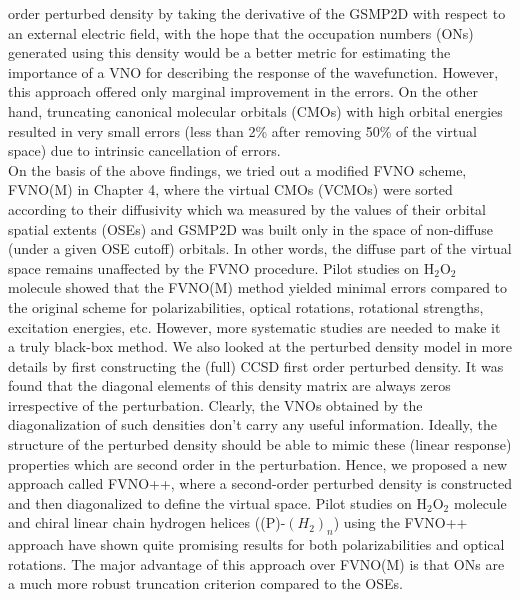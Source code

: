 order perturbed density by taking the derivative of the GSMP2D with 
respect to an external electric field, with the hope that the occupation 
numbers (ONs) generated using this density would be a better metric for 
estimating the importance of a VNO for describing the response of the 
wavefunction. However, this approach offered only marginal improvement 
in the errors. On the other hand, truncating canonical molecular orbitals (CMOs) 
with high orbital energies resulted in very small errors (less than 2\% after 
removing 50\% of the virtual space) due to intrinsic cancellation of errors.\\
On the basis of the above findings, we tried out a modified FVNO scheme, FVNO(M)
in Chapter 4, where the virtual CMOs (VCMOs) were sorted according to their diffusivity which 
wa measured by the values of their orbital spatial extents (OSEs) and GSMP2D was 
built only in the space of non-diffuse (under a given OSE cutoff) orbitals. 
In other words, the diffuse part of the virtual space remains unaffected 
by the FVNO procedure. Pilot studies on H$_2$O$_2$ molecule showed that the
FVNO(M) method yielded minimal errors compared to the original scheme 
for polarizabilities, optical rotations, rotational strengths, 
excitation energies, etc. However, more systematic studies are needed to 
make it a truly black-box method. We also looked at the perturbed density 
model in more details by first constructing the (full) CCSD first order 
perturbed density. It was found that the diagonal elements of this density 
matrix are always zeros irrespective of the perturbation. Clearly, the VNOs
obtained by the diagonalization of such densities don't carry any useful information.
Ideally, the structure of the perturbed density should be able to mimic these (linear response) properties 
which are second order in the perturbation. Hence, we proposed a new approach called
FVNO++, where a second-order perturbed density is constructed and then diagonalized
to define the virtual space. Pilot studies on H$_2$O$_2$ molecule and chiral linear chain
hydrogen helices ((P)-$(H_2)_n$) using the FVNO++ approach have shown quite promising results 
for both polarizabilities and optical rotations. The major advantage of this approach 
over FVNO(M) is that ONs are a much more robust truncation criterion compared to the OSEs.\\
